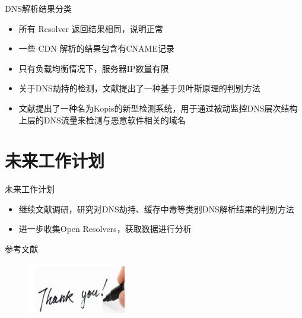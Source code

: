 \documentclass{beamer}
\begin{document}
\begin{frame}{DNS解析结果分类}

  \begin{itemize}
    \item 所有 Resolver 返回结果相同，说明正常
    \item 一些 CDN 解析的结果包含有CNAME记录
    \item 只有负载均衡情况下，服务器IP数量有限
    \item 关于DNS劫持的检测，文献\cite{Yan2006}提出了一种基于贝叶斯原理的判别方法
    \item 文献\cite{Antonakakis2011}提出了一种名为Kopis的新型检测系统，用于通过被动监控DNS层次结构上层的DNS流量来检测与恶意软件相关的域名
  \end{itemize}

\end{frame}

\section{未来工作计划}

\begin{frame}{未来工作计划}

  \begin{itemize}
    \item 继续文献调研，研究对DNS劫持、缓存中毒等类别DNS解析结果的判别方法
    \item 进一步收集Open Resolvers，获取数据进行分析
  \end{itemize}

\end{frame}


 \begin{frame}{参考文献}
  \scriptsize
  
\end{frame}

\begin{frame}
  \begin{figure}
    \includegraphics[height=2.23cm,width=4.29cm]{images/thank.jpg}
  \end{figure} 
\end{frame}
\end{document}
